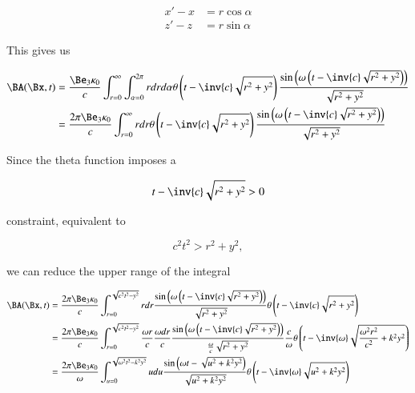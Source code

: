 \begin{align}\label{eqn:relElectroDynProblemSet5P1:90}
x' - x &= r \cos\alpha \\
z' - z &= r \sin\alpha 
\end{align}

This gives us

\begin{align*}
\BA(\Bx, t) 
&= \frac{
\Be_3 \kappa_0
}{c} \int_{r=0}^\infty \int_{\alpha=0}^{2\pi} r dr d\alpha
\theta\left(t - \inv{c} \sqrt{r^2 + y^2}\right) 
\frac{\sin\left(\omega\left(t - \inv{c} \sqrt{r^2 + y^2 }\right)\right)}{\sqrt{r^2 + y^2}} \\
&= \frac{
2 \pi \Be_3 \kappa_0
}{c} \int_{r=0}^\infty r dr 
\theta\left(t - \inv{c} \sqrt{r^2 + y^2}\right) 
\frac{\sin\left(\omega\left(t - \inv{c} \sqrt{r^2 + y^2 }\right)\right)}{\sqrt{r^2 + y^2}} \\
\end{align*}

Since the theta function imposes a 

\begin{equation}\label{eqn:relElectroDynProblemSet5P1:110}
t - \inv{c} \sqrt{r^2 + y^2 } > 0
\end{equation}

constraint, equivalent to

\begin{equation}\label{eqn:relElectroDynProblemSet5P1:130}
c^2 t^2 > r^2 + y^2,
\end{equation}

we can reduce the upper range of the integral

\begin{align*}
\BA(\Bx, t) 
&= \frac{
2 \pi \Be_3 \kappa_0
}{c} 
\int_{r=0}^{\sqrt{c^2 t^2 - y^2}} r dr 
\frac{\sin\left(\omega\left(t - \inv{c} \sqrt{r^2 + y^2 }\right)\right)}{\sqrt{r^2 + y^2}}  
\theta\left(t - \inv{c} \sqrt{r^2 + y^2}\right) \\
&= \frac{
2 \pi \Be_3 \kappa_0
}{c} 
\int_{r=0}^{\sqrt{c^2 t^2 - y^2}} \frac{ \omega r}{c} \frac{\omega dr }{c}
\frac{\sin\left(\omega\left(t - \inv{c} \sqrt{r^2 + y^2 }\right)\right)}{\frac{\omega}{c} \sqrt{r^2 + y^2}} \frac{c}{\omega} 
\theta\left(t - \inv{\omega} \sqrt{\frac{\omega^2 r^2}{c^2} + k^2 y^2}\right)  \\
&= 
\frac{ 2 \pi \Be_3 \kappa_0 }{\omega} 
\int_{u=0}^{\sqrt{\omega^2 t^2 - k^2 y^2}} u du 
\frac{\sin\left( \omega t - \sqrt{u^2 + k^2 y^2 } \right)}{\sqrt{u^2 + k^2 y^2}} 
\theta\left(t - \inv{\omega} \sqrt{u^2 + k^2 y^2}\right)  \\
\end{align*}

